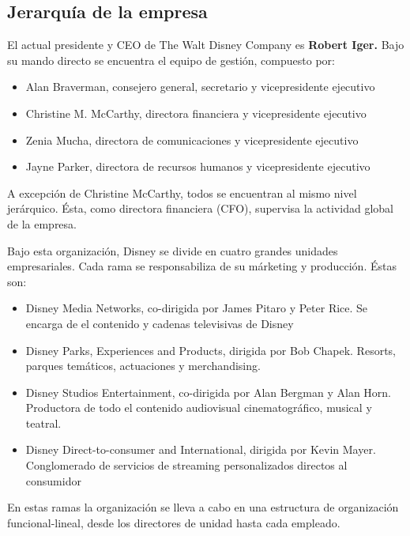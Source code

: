 \subsection{Jerarquía de la empresa}
El actual presidente y CEO de The Walt Disney Company es \textbf{Robert Iger.} Bajo su mando directo se encuentra el equipo de gestión, compuesto por:
\begin{itemize}
\item Alan Braverman, consejero general, secretario y vicepresidente ejecutivo

\item Christine M. McCarthy, directora financiera y vicepresidente ejecutivo

\item Zenia Mucha, directora de comunicaciones y vicepresidente ejecutivo

\item Jayne Parker, directora de recursos humanos y vicepresidente ejecutivo

\end{itemize}

A excepción de Christine McCarthy, todos se encuentran al mismo nivel jerárquico. Ésta,  como directora financiera (CFO), supervisa la actividad global de la empresa.

Bajo esta organización, Disney se divide en cuatro grandes unidades empresariales. Cada rama se responsabiliza de su márketing y producción. Éstas son:
\begin{itemize}
\item Disney Media Networks, co-dirigida por James Pitaro y Peter Rice. Se encarga de el contenido y cadenas televisivas de Disney

\item Disney Parks, Experiences and Products, dirigida por Bob Chapek. Resorts, parques temáticos, actuaciones y merchandising.

\item Disney Studios Entertainment, co-dirigida por Alan Bergman y Alan Horn. Productora de todo el contenido audiovisual cinematográfico, musical y teatral.

\item Disney Direct-to-consumer and International, dirigida por Kevin Mayer. Conglomerado de servicios de streaming personalizados directos al consumidor

\end{itemize}

En estas ramas la organización se lleva a cabo en una estructura de organización funcional-lineal, desde los directores de unidad hasta cada empleado. 


